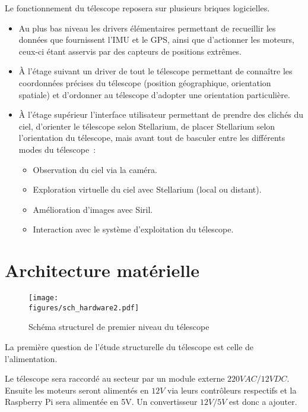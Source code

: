 \vspace{1cm}

Le fonctionnement du télescope reposera sur plusieurs briques logicielles.
\begin{itemize}[label=$\bullet$]
	\item Au plus bas niveau les drivers élémentaires permettant de recueillir les données que fournissent l'IMU et le GPS, ainsi que d'actionner les moteurs, ceux-ci étant asservis par des capteurs de positions extrêmes.
	\item À l'étage suivant un driver de tout le télescope permettant de connaître les coordonnées précises du télescope (position géographique, orientation spatiale) et d'ordonner au télescope d'adopter une orientation particulière.
	\item À l'étage supérieur l'interface utilisateur permettant de prendre des clichés du ciel, d'orienter le télescope selon Stellarium, de placer Stellarium selon l'orientation du télescope, mais avant tout de basculer entre les différents modes du télescope~:
	\begin{itemize}
		\item Observation du ciel via la caméra.
		\item Exploration virtuelle du ciel avec Stellarium (local ou distant).
		\item Amélioration d'images avec Siril.
		\item Interaction avec le système d'exploitation du télescope.
		\end{itemize}
	\end{itemize}

\section{Architecture matérielle}

\begin{figure}[H]
    \centering
    \texttt{[image: \\figures/sch\_hardware2.pdf]}
    \decoRule
    \caption[
    Schéma structurel de premier niveau du télescope]{
    Schéma structurel de premier niveau du télescope}
    \label{fig:Schéma structurel de premier niveau du télescope}
    \end{figure}

\vspace{1cm}

La première question de l'étude structurelle du télescope est celle de l'alimentation.

Le télescope sera raccordé au secteur par un module externe $220VAC / 12VDC$. Ensuite les moteurs seront alimentés en $12V$ via leurs contrôleurs respectifs et la Raspberry Pi sera alimentée en 5V. Un convertisseur $12V / 5V$ est donc a ajouter.

